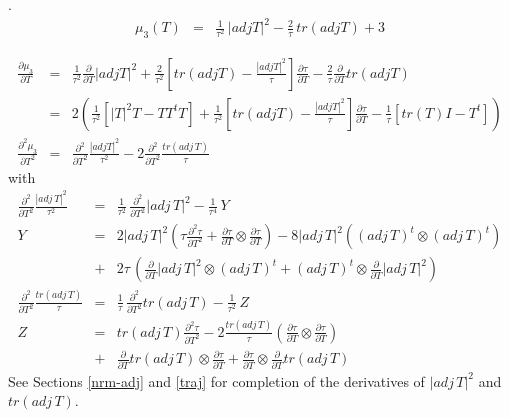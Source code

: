 \documentclass{report}
\begin{document}
. \newline
\begin{eqnarray}
\mu_3 (T) & = & \frac{1}{\tau^2} \, |adj T|^2 - \frac{2}{\tau} \, tr(adj T) + 3
\end{eqnarray}

\begin{eqnarray}
\frac{\partial \mu_3}{\partial T} &=& 
  \frac{1}{\tau^2}\frac{\partial}{\partial T}|adj T|^2 +
  \frac{2}{\tau^2}\left[ tr(adj T) - \frac{|adj T|^2}{\tau}\right ] \frac{\partial \tau}{\partial T} -
  \frac{2}{\tau}\frac{\partial}{\partial T} tr(adj T) \\
  & = & \nonumber 2 \left( 
  \frac{1}{\tau^2}\left[ |T|^2 T - T T^t T \right] +
  \frac{1}{\tau^2}\left[ tr(adj T) - \frac{|adj T|^2}{\tau}\right ] \frac{\partial \tau}{\partial T} -
  \frac{1}{\tau}\left[ tr(T) I - T^t \right] \right) \\
\frac{\partial^2 \mu_3}{\partial T^2} &=& \frac{\partial^2}{\partial T^2} \frac{|adj T|^2}{\tau^2} - 2 \frac{\partial^2}{\partial T^2} \frac{tr(adj \, T)}{\tau}
\end{eqnarray}
with
\begin{eqnarray}
\frac{\partial^2}{\partial T^2} \frac{|adj \, T|^2}{\tau^2} & = & \frac{1}{\tau^2} \, \frac{\partial^2}{\partial T^2} |adj \, T|^2 - \frac{1}{\tau^4} \, Y \label{adj-frac} \\
Y & = & 2 |adj \, T|^2 \left( \tau \frac{\partial^2 \tau}{\partial T^2} + \frac{\partial \tau}{\partial T} \otimes \frac{\partial \tau}{\partial T} \right) - 8 |adj \, T|^2 \left( (adj \, T)^t \otimes (adj \, T)^t \right) \nonumber \label{yadj-frac} \\
 & + & 2 \tau \, \left( \frac{\partial}{\partial T} |adj \, T|^2 \otimes (adj \, T)^t + (adj \, T)^t \otimes  \frac{\partial}{\partial T} |adj \, T|^2 \right) \\
\frac{\partial^2}{\partial T^2} \frac{tr(adj \, T)}{\tau} & = & \frac{1}{\tau} \, \frac{\partial^2}{\partial T^2} tr(adj \, T) - \frac{1}{\tau^2} \, Z \\
Z & = & tr(adj \, T) \frac{\partial^2 \tau}{\partial T^2} - 2 \frac{tr(adj \, T)}{\tau} \left( \frac{\partial \tau}{\partial T} \otimes  \frac{\partial \tau}{\partial T} \right) \nonumber \\
 & + & \frac{\partial}{\partial T} tr(adj \, T) \otimes \frac{\partial \tau}{\partial T} + \frac{\partial \tau}{\partial T} \otimes  \frac{\partial}{\partial T} tr(adj \, T)
\end{eqnarray}
See Sections \ref{nrm-adj} and \ref{traj} for completion of the derivatives of 
$|adj \, T|^2$ and $tr(adj \, T)$. \newline
\end{document}

